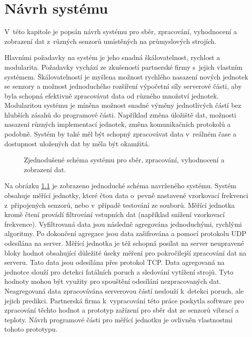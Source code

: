 \chapter{Návrh systému}\label{kap:design}
V~této kapitole je popsán návrh systému pro sběr, zpracování, vyhodnocení a zobrazení dat z~různých senzorů umístěných na průmyslových strojích.

Hlavními požadavky na systém je jeho snadná škálovatelnost, rychlost a modularita. Požadavky vychází ze zkušeností partnerské firmy s~jejich vlastním systémem. Škálovatelností je myšlena možnost rychlého nasazení nových jednotek se senzory a možnost jednoduchého rozšíření výpočetní síly serverové části, aby byla schopná efektivně zpracovávat data od různého množství jednotek. Modularitou systému je míněna možnost snadné výměny jednotlivých částí bez hlubších zásahů do programové části. Například změna úložiště dat, možnosti nasazení různých implementací jednotek, změna komunikačních protokolů a podobně. Systém by také měl být schopný zpracovávat data v~reálném čase a dostupnost uložených dat by měla být okamžitá.

\begin{figure}[h]
  \centering
  \caption{Zjednodušené schéma systému pro sběr, zpracování, vyhodnocení a zobrazení dat.}\label{pic:basic_design}
\end{figure}

Na obrázku \ref{pic:basic_design} je zobrazeno jednoduché schéma navrženého systému. Systém obsahuje měřící jednotky, které čtou data o~pevně nastavené vzorkovací frekvenci z~připojených senzorů, nebo v~případě testování ze souborů. Měřící jednotka kromě čtení provádí filtrování vstupních dat (například snížení vzorkovací frekvence). Vyfiltrovaná data jsou následně agregována jednoduchými, rychlými algoritmy. Po dokončení agregace jsou data zašifrována a pomocí protokolu UDP odesílána na server. Měřící jednotka je též schopná posílat na server neupravené bloky hodnot obsahující důležité úseky měření pro pokročilejší zpracování dat na serveru. Tato data jsou odesílána přes protokol TCP. Data agregovaná na jednotce slouží pro detekci fatálních poruch a sledování vytížení strojů. Tyto hodnoty mohou být využity pro spouštění odesílání nezpracovaných dat. Neagregovaná data zpracovávána serverovou částí neslouží k~detekci poruch, ale jejich predikci. Partnerská firma k~vypracování této práce poskytla software pro zpracování těchto hodnot a prototyp zařízení pro sběr dat ze senzorů vibrací a teploty. Návrh programové části pro měřící jednotku je ovlivněn vlastnostmi tohoto prototypu.


